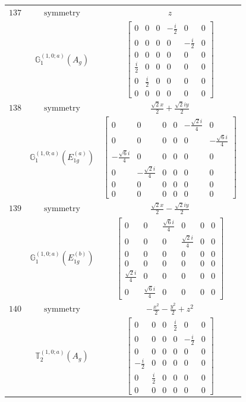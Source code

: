 \documentclass[fleqn,8pt,landscape]{jsarticle}
\begin{document}
\begin{longtable}{ccc}
$ 137 $ & $ \text{symmetry} $ & $ z $ \\
$  $ & $ \mathbb{G}_{1}^{(1,0;a)}(A_{g}) $ & $ \begin{bmatrix} 0 & 0 & 0 & - \frac{i}{2} & 0 & 0 \\ 0 & 0 & 0 & 0 & - \frac{i}{2} & 0 \\ 0 & 0 & 0 & 0 & 0 & 0 \\ \frac{i}{2} & 0 & 0 & 0 & 0 & 0 \\ 0 & \frac{i}{2} & 0 & 0 & 0 & 0 \\ 0 & 0 & 0 & 0 & 0 & 0 \end{bmatrix} $ \\ \hline
$ 138 $ & $ \text{symmetry} $ & $ \frac{\sqrt{2} x}{2} + \frac{\sqrt{2} i y}{2} $ \\
$  $ & $ \mathbb{G}_{1}^{(1,0;a)}(E_{1g}^{(a)}) $ & $ \begin{bmatrix} 0 & 0 & 0 & 0 & - \frac{\sqrt{2} i}{4} & 0 \\ 0 & 0 & 0 & 0 & 0 & - \frac{\sqrt{6} i}{4} \\ - \frac{\sqrt{6} i}{4} & 0 & 0 & 0 & 0 & 0 \\ 0 & - \frac{\sqrt{2} i}{4} & 0 & 0 & 0 & 0 \\ 0 & 0 & 0 & 0 & 0 & 0 \\ 0 & 0 & 0 & 0 & 0 & 0 \end{bmatrix} $ \\ \hline
$ 139 $ & $ \text{symmetry} $ & $ \frac{\sqrt{2} x}{2} - \frac{\sqrt{2} i y}{2} $ \\
$  $ & $ \mathbb{G}_{1}^{(1,0;a)}(E_{1g}^{(b)}) $ & $ \begin{bmatrix} 0 & 0 & \frac{\sqrt{6} i}{4} & 0 & 0 & 0 \\ 0 & 0 & 0 & \frac{\sqrt{2} i}{4} & 0 & 0 \\ 0 & 0 & 0 & 0 & 0 & 0 \\ 0 & 0 & 0 & 0 & 0 & 0 \\ \frac{\sqrt{2} i}{4} & 0 & 0 & 0 & 0 & 0 \\ 0 & \frac{\sqrt{6} i}{4} & 0 & 0 & 0 & 0 \end{bmatrix} $ \\ \hline
$ 140 $ & $ \text{symmetry} $ & $ - \frac{x^{2}}{2} - \frac{y^{2}}{2} + z^{2} $ \\
$  $ & $ \mathbb{T}_{2}^{(1,0;a)}(A_{g}) $ & $ \begin{bmatrix} 0 & 0 & 0 & \frac{i}{2} & 0 & 0 \\ 0 & 0 & 0 & 0 & - \frac{i}{2} & 0 \\ 0 & 0 & 0 & 0 & 0 & 0 \\ - \frac{i}{2} & 0 & 0 & 0 & 0 & 0 \\ 0 & \frac{i}{2} & 0 & 0 & 0 & 0 \\ 0 & 0 & 0 & 0 & 0 & 0 \end{bmatrix} $ \\ \hline

\end{longtable}
\end{document}
